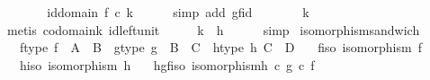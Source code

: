 \begin{isabellebody}
\ \ \isamarkupfalse%
\ \isamarkupfalse%
\ {\isachardoublequoteopen}{\isachardot}{\kern0pt}{\isachardot}{\kern0pt}{\isachardot}{\kern0pt}\ {\isacharequal}{\kern0pt}\ id{\isacharparenleft}{\kern0pt}domain\ f{\isacharparenright}{\kern0pt}\ {\isasymcirc}\isactrlsub c\ k{\isachardoublequoteclose}\isanewline
\ \ \ \ \isamarkupfalse%
\ {\isacharparenleft}{\kern0pt}simp\ add{\isacharcolon}{\kern0pt}\ gf{\isacharunderscore}{\kern0pt}id{\isacharparenright}{\kern0pt}\isanewline
\ \ \isamarkupfalse%
\ \isamarkupfalse%
\ {\isachardoublequoteopen}{\isachardot}{\kern0pt}{\isachardot}{\kern0pt}{\isachardot}{\kern0pt}\ {\isacharequal}{\kern0pt}\ k{\isachardoublequoteclose}\isanewline
\ \ \ \ \isamarkupfalse%
\ {\isacharparenleft}{\kern0pt}metis\ codomain{\isacharunderscore}{\kern0pt}k\ id{\isacharunderscore}{\kern0pt}left{\isacharunderscore}{\kern0pt}unit{\isacharparenright}{\kern0pt}\isanewline
\ \ \isamarkupfalse%
\ \isamarkupfalse%
\ {\isachardoublequoteopen}k\ {\isacharequal}{\kern0pt}\ h{\isachardoublequoteclose}\isanewline
\ \ \ \ \isamarkupfalse%
\ simp\isanewline
{}\isamarkupfalse%
%
\endisatagproof
{\isafoldproof}%
%
\isadelimproof
\isanewline
%
\endisadelimproof
\isanewline
{}\isamarkupfalse%
\ isomorphism{\isacharunderscore}{\kern0pt}sandwich{\isacharcolon}{\kern0pt}\ \isanewline
\ \ \ f{\isacharunderscore}{\kern0pt}type{\isacharcolon}{\kern0pt}\ {\isachardoublequoteopen}f\ {\isacharcolon}{\kern0pt}\ A\ {\isasymrightarrow}\ B{\isachardoublequoteclose}\ \ g{\isacharunderscore}{\kern0pt}type{\isacharcolon}{\kern0pt}\ {\isachardoublequoteopen}g\ {\isacharcolon}{\kern0pt}\ B\ {\isasymrightarrow}\ C{\isachardoublequoteclose}\ \ h{\isacharunderscore}{\kern0pt}type{\isacharcolon}{\kern0pt}\ {\isachardoublequoteopen}h{\isacharcolon}{\kern0pt}\ C\ {\isasymrightarrow}\ D{\isachardoublequoteclose}\isanewline
\ \ \ f{\isacharunderscore}{\kern0pt}iso{\isacharcolon}{\kern0pt}\ {\isachardoublequoteopen}isomorphism\ f{\isachardoublequoteclose}\isanewline
\ \ \ h{\isacharunderscore}{\kern0pt}iso{\isacharcolon}{\kern0pt}\ {\isachardoublequoteopen}isomorphism\ h{\isachardoublequoteclose}\isanewline
\ \ \ hgf{\isacharunderscore}{\kern0pt}iso{\isacharcolon}{\kern0pt}\ {\isachardoublequoteopen}isomorphism{\isacharparenleft}{\kern0pt}h\ {\isasymcirc}\isactrlsub c\ g\ {\isasymcirc}\isactrlsub c\ f{\isacharparenright}{\kern0pt}{\isachardoublequoteclose}\isanewline

\end{isabellebody}
